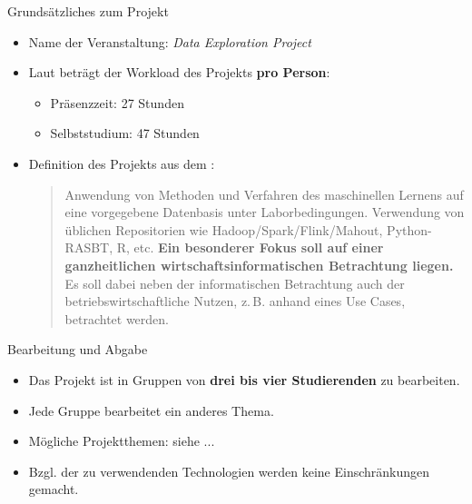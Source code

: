 \begin{dwHeaderFrame}{Grundsätzliches zum Projekt}
	\begin{itemize}
		\item Name der Veranstaltung: \textit{Data Exploration Project}
		\item Laut \modulkatalog{} beträgt der Workload des Projekts \textbf{pro Person}:
		\begin{itemize}
			\item Präsenzzeit: 27 Stunden
			\item Selbststudium: 47 Stunden
		\end{itemize}
		\item Definition des Projekts aus dem \modulkatalog:
		\begin{quote}
			\glqq{}Anwendung von Methoden und Verfahren des maschinellen Lernens auf eine vorgegebene Datenbasis unter Laborbedingungen. Verwendung von üblichen Repositorien wie Hadoop/Spark/Flink/Mahout, Python-RASBT, R, etc.
			\textbf{Ein besonderer Fokus soll auf einer ganzheitlichen wirtschaftsinformatischen Betrachtung liegen.} Es soll dabei neben der informatischen Betrachtung auch der betriebswirtschaftliche Nutzen, z.\,B. anhand eines Use Cases, betrachtet werden.\grqq{}
		\end{quote}
	\end{itemize}
\end{dwHeaderFrame}


\begin{dwHeaderFrame}{Bearbeitung und Abgabe}
	\begin{itemize}
		\item Das Projekt ist in Gruppen von \textbf{drei bis vier Studierenden} zu bearbeiten.
		\item Jede Gruppe bearbeitet ein anderes Thema.
		\item Mögliche Projektthemen: siehe ...
		\item Bzgl. der zu verwendenden Technologien werden keine Einschränkungen gemacht.
	\end{itemize}
	
\end{dwHeaderFrame}


